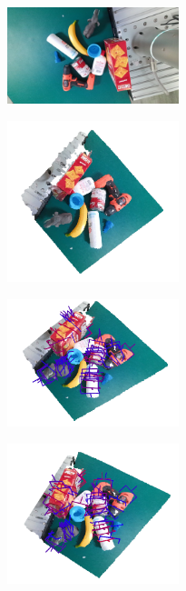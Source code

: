 \begin{figure}[h!]
  \centering  
    \begin{subfigure}[b]{0.25\linewidth}
    \includegraphics[width=5cm]{figs/Attention_module_results/color.png}
  \caption{}  
  \end{subfigure}
  
  
  \begin{subfigure}[b]{0.32\linewidth}
    \includegraphics[width=5cm]{figs/Attention_module_results/pointcloud.png}
  \caption{}  
  \end{subfigure} 
  \begin{subfigure}[b]{0.32\linewidth}
    \includegraphics[width=5cm]{figs/Attention_module_results/Non-local.png}
    \caption{} 
  \end{subfigure} 
  \begin{subfigure}[b]{0.32\linewidth}
    \includegraphics[width=5cm]{figs/Attention_module_results/Criss-cross.png}
  \caption{}  
  \end{subfigure}
  

\end{figure}
